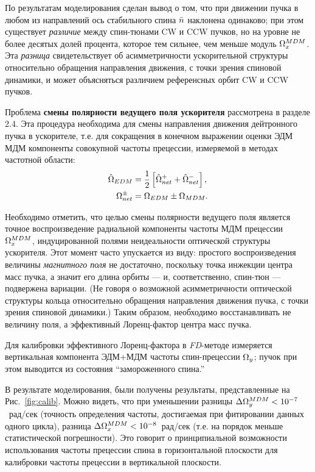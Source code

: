 По результатам моделирования сделан вывод о том, что при движении пучка в любом из направлений 
ось стабильного спина $\bar n$ наклонена одинаково; при этом существует \emph{различие} 
между спин-тюнами CW и CCW пучков, но на уровне не более десятых долей процента, 
которое тем сильнее, чем меньше модуль $\Omega_x^{MDM}$. 
Эта \emph{разница}  свидетельствует об асимметричности ускорительной структуры 
относительно обращения направления движения, с точки зрения спиновой динамики, 
и может объясняться различием референсных орбит CW и CCW пучков. 

Проблема \textbf{смены полярности ведущего поля ускорителя} рассмотрена в разделе 2.4. 
Эта процедура необходима для смены направления движения дейтронного пучка в ускорителе, 
т.е. для сокращения в конечном выражении оценки ЭДМ МДМ компоненты совокупной частоты прецессии, 
измеряемой в методах частотной области:
\begin{align*}
\hat{\Omega}_{EDM} &= \frac12\left[\hat{\Omega}_{net}^+ + \hat{\Omega}_{net}^-\right], \\
\Omega_{net}^\pm  &= \Omega_{EDM} \pm \Omega_{MDM}.
\end{align*}

Необходимо отметить, что целью смены полярности ведущего поля является 
точное воспроизведение радиальной компоненты частоты МДМ прецессии $\Omega_x^{MDM}$, 
индуцированной полями неидеальности оптической структуры ускорителя. 
Этот момент часто упускается из виду: простого воспроизведения величины \emph{магнитного поля} 
не достаточно, поскольку точка инжекции центра масс пучка, а значит его длина орбиты --- 
и, соответственно, спин-тюн --- подвержена вариации. (Не говоря о возможной асимметричности 
оптической структуры кольца относительно обращения направления движения пучка, 
с точки зрения спиновой динамики.) Таким образом, необходимо восстанавливать не величину поля, 
а эффективный Лоренц-фактор центра масс пучка.

Для калибровки эффективного Лоренц-фактора в \emph{FD}-методе измеряется вертикальная компонента
ЭДМ+МДМ частоты спин-прецессии $\Omega_y$; пучок при этом выводится из состояния ``замороженного спина.'' 

В результате моделирования, были получены результаты, представленные на Рис.~\ref{fig:calib}.
%
Можно видеть, что при уменьшении разницы ${\Delta\Omega_y^{MDM} < 10^{-7}}$~рад/сек 
(точность определения частоты, достигаемая при фитировании данных одного цикла), 
разница ${\Delta \Omega_x^{MDM} < 10^{-8}}$~рад/сек (т.е. на порядок меньше статистической погрешности). 
Это говорит о принципиальной возможности использования частоты прецессии спина в горизонтальной плоскости 
для калибровки частоты прецессии в вертикальной плоскости.

